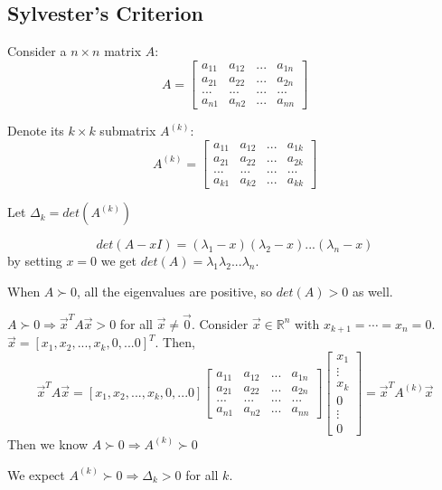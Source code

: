 \documentclass[11pt]{elegantbook}
\begin{document}
\subsection{Sylvester’s Criterion}

Consider a $n\times n$ matrix $A$: $$A=\begin{bmatrix}
    a_{11}&a_{12}&... &a_{1n}\\a_{21}&a_{22}&...&a_{2n}\\...&...&...&...\\a_{n1}&a_{n2}&...&a_{nn}
\end{bmatrix}$$

Denote its $k\times k$ submatrix $A^{(k)}$:
$$A^{(k)}=\begin{bmatrix}
    a_{11}&a_{12}&... &a_{1k}\\a_{21}&a_{22}&...&a_{2k}\\...&...&...&...\\a_{k1}&a_{k2}&...&a_{kk}
\end{bmatrix}$$

Let $\Delta_k=det(A^{(k)})$

$$det(A-xI)=(\lambda_1-x)(\lambda_2-x)...(\lambda_n-x)$$
by setting $x = 0$ we get $det(A) = \lambda_1\lambda_2...\lambda_n$.

When $A\succ 0$, all the eigenvalues are positive, so $det(A) > 0$ as well.

$A\succ 0\Rightarrow \vec{x}^TA\vec{x}>0$ for all $\vec{x}\neq \vec{0}$. Consider $\vec{x}\in \mathbb{R}^n$ with $x_{k+1}=\cdots=x_n=0$. $\vec{x}=[x_1,x_2,...,x_k,0,...0]^T$. Then,
$$\vec{x}^TA\vec{x}=[x_1,x_2,...,x_k,0,...0]\begin{bmatrix}
    a_{11}&a_{12}&... &a_{1n}\\a_{21}&a_{22}&...&a_{2n}\\...&...&...&...\\a_{n1}&a_{n2}&...&a_{nn}
\end{bmatrix}\begin{bmatrix}
    x_1\\
    \vdots\\
    x_k\\
    0\\
    \vdots\\
    0
\end{bmatrix}=\vec{x}^TA^{(k)}\vec{x}$$
Then we know $A\succ 0 \Rightarrow A^{(k)}\succ 0$

We expect $A^{(k)}\succ 0\Rightarrow \Delta_k>0$ for all $k$.
\end{document}
